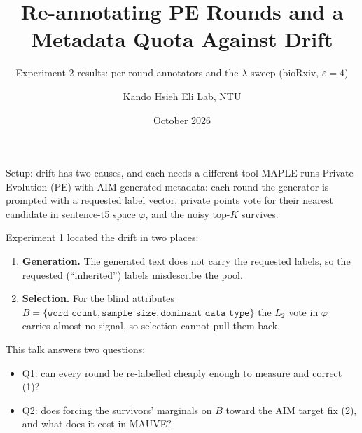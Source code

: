 \documentclass[11pt,aspectratio=169]{beamer}
\title[PE metadata drift: re-annotation + quota sweep]{Re-annotating PE Rounds and a Metadata Quota Against Drift}
\subtitle{Experiment 2 results: per-round annotators and the $\lambda$ sweep (bioRxiv, $\varepsilon = 4$)}
\author{Kando Hsieh \quad Eli Lab, NTU}
\date{October 2026}
\begin{document}
\begin{frame}[plain]\titlepage\end{frame}

\begin{frame}{Setup: drift has two causes, and each needs a different tool}
MAPLE runs Private Evolution (PE) with AIM-generated metadata: each round the generator is prompted with a requested label vector, private points vote for their nearest candidate in sentence-t5 space $\varphi$, and the noisy top-$K$ survives.

\medskip
Experiment 1 located the drift in two places:
\begin{enumerate}
  \item \textbf{Generation.} The generated text does not carry the requested labels, so the requested (``inherited'') labels misdescribe the pool.
  \item \textbf{Selection.} For the \alert{blind attributes} $B = \{\texttt{word\_count}, \texttt{sample\_size}, \texttt{dominant\_data\_type}\}$ the $L_2$ vote in $\varphi$ carries almost no signal, so selection cannot pull them back.
\end{enumerate}

\medskip
This talk answers two questions:
\begin{itemize}
  \item Q1: can every round be re-labelled cheaply enough to measure and correct (1)?
  \item Q2: does forcing the survivors' marginals on $B$ toward the AIM target fix (2), and what does it cost in MAUVE?
\end{itemize}
\end{frame}
\end{document}

